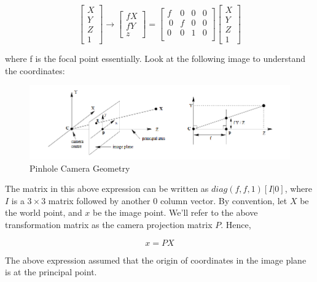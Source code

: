 \begin{equation*}
    \begin{bmatrix}
    X \\
    Y \\
    Z \\
    1
    \end{bmatrix}\longrightarrow \begin{bmatrix}
    fX \\
    fY \\
    z
    \end{bmatrix} = \begin{bmatrix}
    f & 0 & 0 & 0 \\\
    0 & f & 0 & 0 \\
    0 & 0 & 1 & 0 \\
    \end{bmatrix} \begin{bmatrix}
    X \\
    Y \\
    Z \\
    1
    \end{bmatrix}
\end{equation*}

where f is the focal point essentially. Look at the following image to understand the coordinates:

\begin{figure}[t]
    \centering
    \includegraphics[width=12cm]{img/pinholecamerageometry.png}
    \caption{Pinhole Camera Geometry}
    \label{fig:pinhole-cam-geo}
\end{figure}

The matrix in this above expression can be written as $diag(f,f,1)[I|0]$, where $I$ is a $3\times3$ matrix followed by another $0$ column vector. By convention, let $X$ be the world point, and $x$ be the image point. We'll refer to the above transformation matrix as the camera projection matrix $P$. Hence,

\begin{equation}
    x = PX
\end{equation}

The above expression assumed that the origin of coordinates in the image plane is at the principal point. 

